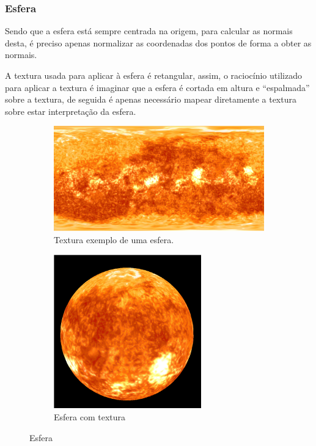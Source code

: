 \documentclass[a4paper]{article}
\begin{document}
\subsubsection{Esfera}\label{sec:esfera}
Sendo que a esfera está sempre centrada na origem, para calcular as normais
desta, é preciso apenas normalizar as coordenadas dos pontos de forma a obter
as normais.

A textura usada para aplicar à esfera é retangular, assim, o raciocínio
utilizado para aplicar a textura é imaginar que a esfera é cortada em altura e
``espalmada'' sobre a textura, de seguida é apenas necessário mapear
diretamente a textura sobre estar interpretação da esfera.

\begin{figure}[H]
    \centering
    \begin{subfigure}{0.4\textwidth}
        \centering
        \includegraphics[width=\textwidth]{../assets/2k_sun.jpg}
        \caption{Textura exemplo de uma esfera.}
    \end{subfigure}
    \begin{subfigure}{0.4\textwidth}
        \centering
        \includegraphics[width=0.7\textwidth]{sphere.png}
        \caption{Esfera com textura}
    \end{subfigure}
    \caption{Esfera}
\end{figure}
\end{document}
